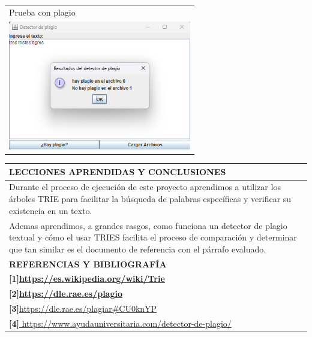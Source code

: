 \documentclass[9pt]{article}
\begin{document}
\begin{longtable}{|p{15cm}|}
		Prueba con plagio\\
		\includegraphics[width=8cm]{img/prueba2.png}\\

	
		\hline
	\end{longtable}
	\begin{table}[H]
		\begin{tabular}{|p{15cm}|}
			\hline 
			\rowcolor{tablebackground}
			\color{white}\textbf{LECCIONES APRENDIDAS Y CONCLUSIONES}  \\
			\hline 
			Durante el proceso de ejecución de este proyecto aprendimos a utilizar los árboles TRIE para facilitar la búsqueda de palabras específicas y verificar su existencia en un texto.\\
			Ademas aprendimos, a grandes rasgos, como funciona un detector de plagio textual y cómo el usar TRIES facilita el proceso de comparación y determinar que tan similar es el documento de referencia con el párrafo evaluado.\\
		\hline 
		\rowcolor{tablebackground}
		\color{white}\textbf{REFERENCIAS Y BIBLIOGRAFÍA}  \\
		\hline 
		\textbf{[1]\url{https://es.wikipedia.org/wiki/Trie}}\\
		\textbf{[2]\url{https://dle.rae.es/plagio}}\\
		\textbf{[3]}\url{https://dle.rae.es/plagiar#CU0knYP}\\
		\textbf{[4]}\url{	https://www.ayudauniversitaria.com/detector-de-plagio/}\\
	
	
		\hline 
	\end{tabular}
\end{table}
\end{document}

